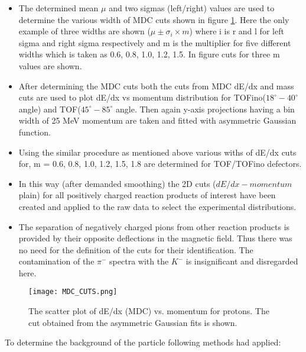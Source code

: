 \begin{itemize}
   \item The determined mean $\mu$ and two sigmas (left/right) values are used to determine the various width of MDC cuts shown in figure \ref{PID_cut_1}. Here the only example of three widths are shown ($\mu \pm \sigma_i \times m$) where i is r and l for left sigma and right sigma respectively and m is the multiplier for five different widths which is taken as 0.6, 0.8, 1.0, 1.2, 1.5. In figure cuts for three m values are shown.
   \item After determining the MDC cuts both the cuts from MDC  dE/dx and mass cuts are used to plot dE/dx vs momentum distribution for TOFino($18^\circ-40^\circ$ angle) and TOF($45^\circ-85^\circ$ angle. Then again y-axis projections having a bin width of 25 MeV momentum are taken and fitted with asymmetric Gaussian function.
  \item Using the similar procedure as mentioned above various withs of dE/dx cuts for, m = 0.6, 0.8, 1.0, 1.2, 1.5, 1.8 are determined for TOF/TOFino defectors.
  \item In this way (after demanded smoothing) the 2D cuts ($dE/dx - momentum$ plain) for
  all positively charged reaction products of interest have been created and applied to the raw 
  data to select the experimental distributions.
  \item The separation of negatively charged pions from other reaction products is provided by their opposite deflections in the magnetic field. Thus there was no need for the definition of the cuts for their identification. The contamination of the $\pi^{-}$ spectra with the $K^{-}$ is insignificant and disregarded here.
\end{itemize}
 \begin{figure}
   	\centering
   	\texttt{[image: MDC\_CUTS.png]}
   	\caption{The scatter plot of dE/dx (MDC) vs. momentum for protons. The cut obtained from the asymmetric Gaussian fits is shown. %
   	}
   	\label{PID_cut_1}
   \end{figure}
To determine the background of the particle following methods had applied:
